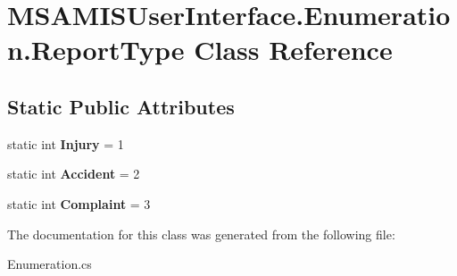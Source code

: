 \hypertarget{class_m_s_a_m_i_s_user_interface_1_1_enumeration_1_1_report_type}{}\section{M\+S\+A\+M\+I\+S\+User\+Interface.\+Enumeration.\+Report\+Type Class Reference}
\label{class_m_s_a_m_i_s_user_interface_1_1_enumeration_1_1_report_type}
\subsection*{Static Public Attributes}
\begin{DoxyCompactItemize}
\item 
\mbox{\label{class_m_s_a_m_i_s_user_interface_1_1_enumeration_1_1_report_type_a94c60ac6143c70dfcdaa20fcbdfa0e0d}} 
static int {\bfseries Injury} = 1
\item 
\mbox{\label{class_m_s_a_m_i_s_user_interface_1_1_enumeration_1_1_report_type_aa8e914c1fe5165ba4e5bc5945ea8f6ad}} 
static int {\bfseries Accident} = 2
\item 
\mbox{\label{class_m_s_a_m_i_s_user_interface_1_1_enumeration_1_1_report_type_a47e135fea51f0d0bc8634d23e01f256b}} 
static int {\bfseries Complaint} = 3
\end{DoxyCompactItemize}


The documentation for this class was generated from the following file\+:\begin{DoxyCompactItemize}
\item 
Enumeration.\+cs\end{DoxyCompactItemize}
